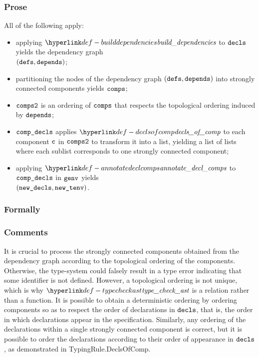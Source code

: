 \subsubsection{Prose}
All of the following apply:
\begin{itemize}
  \item applying $\builddependencies$ to $\decls$ yields the dependency graph \\ $(\defs, \dependencies)$;
  \item partitioning the nodes of the dependency graph $(\defs, \dependencies)$ into strongly connected components
        yields $\comps$;
  \item $\compstwo$ is an ordering of $\comps$ that respects the topological ordering induced by $\dependencies$;
  \item $\compdecls$ applies $\declsofcomp$ to each component $\vc$ in $\compstwo$ to transform it into a list,
        yielding a list of lists where each sublist corresponds to one strongly connected component;
  \item applying $\annotatedeclcomps$ to $\compdecls$ in $\genv$ yields \\
        $(\newdecls, \newtenv)$\ProseOrTypeError.
\end{itemize}

\subsubsection{Formally}
\begin{mathpar}
\end{mathpar}

\subsubsection{Comments}
It is crucial to process the strongly connected components obtained from the dependency graph
according to the topological ordering of the components. Otherwise, the type-system could
falsely result in a type error indicating that some identifier is not defined.
However, a topological ordering is not unique, which is why $\typecheckast$ is a relation rather than
a function.
It is possible to obtain a deterministic ordering by ordering components so as to respect
the order of declarations in $\decls$, that is,
the order in which declarations appear in the specification.
Similarly, any ordering of the declarations within a single strongly connected component is correct,
but it is possible to order the declarations according to their order of appearance in $\decls$,
as demonstrated in TypingRule.DeclsOfComp.

